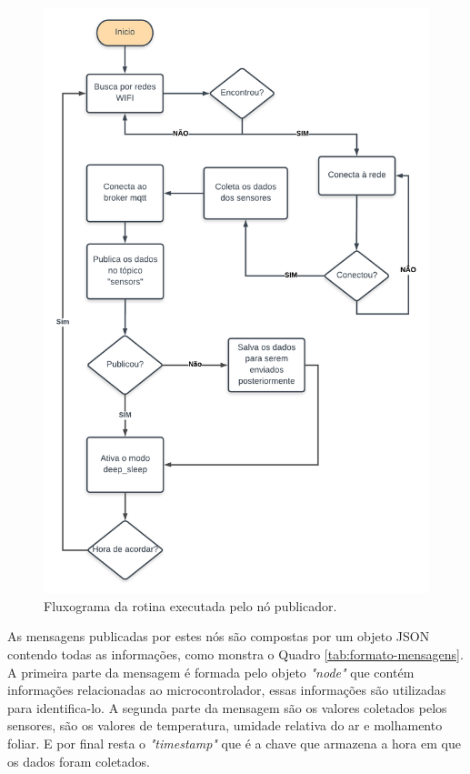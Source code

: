 \begin{figure}[H]
    \centering
    \includegraphics[scale=0.3]{04-figuras/fluxograma-publicador.png}
    \caption{Fluxograma da rotina executada pelo nó publicador.}
    \vspace{-\baselineskip}
    \label{fig:fluxograma-publicador}
\end{figure}

As mensagens publicadas por estes nós são compostas por um objeto JSON contendo todas as informações, como monstra o Quadro \ref{tab:formato-mensagens}. A primeira parte da mensagem é formada pelo objeto \textit{"node"} que contém informações relacionadas ao microcontrolador, essas informações são utilizadas para identifica-lo. A segunda parte da mensagem são os valores coletados pelos sensores, são os valores de temperatura, umidade relativa do ar e molhamento foliar. E por final resta o \textit{"timestamp"} que é a chave que armazena a hora em que os dados foram coletados.

